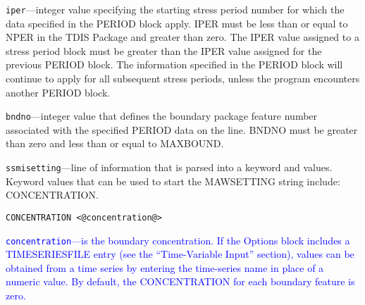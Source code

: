 \begin{description}
\item \texttt{iper}---integer value specifying the starting stress period number for which the data specified in the PERIOD block apply.  IPER must be less than or equal to NPER in the TDIS Package and greater than zero.  The IPER value assigned to a stress period block must be greater than the IPER value assigned for the previous PERIOD block.  The information specified in the PERIOD block will continue to apply for all subsequent stress periods, unless the program encounters another PERIOD block.

\item \texttt{bndno}---integer value that defines the boundary package feature number associated with the specified PERIOD data on the line. BNDNO must be greater than zero and less than or equal to MAXBOUND.

\item \texttt{ssmisetting}---line of information that is parsed into a keyword and values.  Keyword values that can be used to start the MAWSETTING string include: CONCENTRATION.

\begin{lstlisting}[style=blockdefinition]
CONCENTRATION <@concentration@>
\end{lstlisting}

\item \textcolor{blue}{\texttt{concentration}---is the boundary concentration. If the Options block includes a TIMESERIESFILE entry (see the ``Time-Variable Input'' section), values can be obtained from a time series by entering the time-series name in place of a numeric value. By default, the CONCENTRATION for each boundary feature is zero.}

\end{description}

